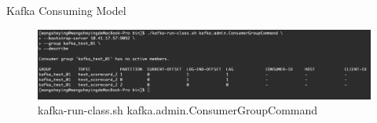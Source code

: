 \begin{frame}[plain,t]{Kafka Consuming Model} %
	 \\  \vspace{2ex}
	\begin{figure}
		\centering
		\includegraphics[width=0.95\linewidth]{image/0307}
		\caption{kafka-run-class.sh kafka.admin.ConsumerGroupCommand}
		\label{fig:0307}
	\end{figure}
	
\end{frame}


